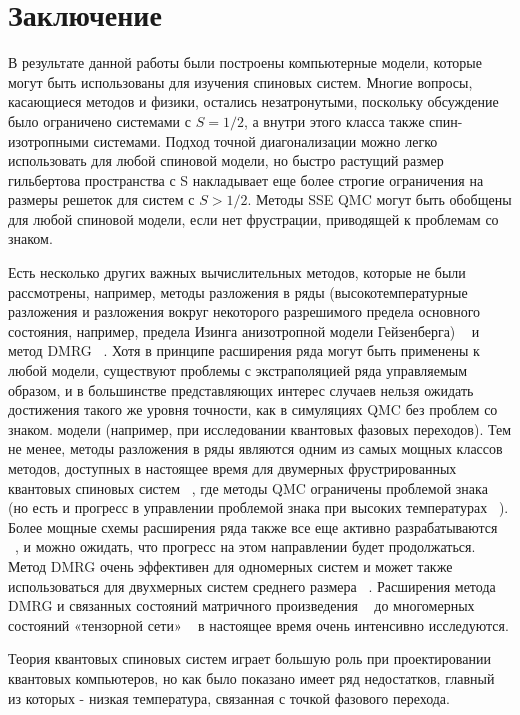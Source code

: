 \documentclass[11pt]{article}
\begin{document}
\section{Заключение}
В результате данной работы были построены компьютерные модели, которые могут быть использованы для изучения спиновых систем.
Многие вопросы, касающиеся методов и физики, остались незатронутыми, поскольку обсуждение было ограничено системами с $S = 1/2$, а внутри этого класса также спин-изотропными системами. Подход точной диагонализации можно легко использовать для любой спиновой модели, но быстро растущий размер гильбертова пространства с S накладывает еще более строгие ограничения на размеры решеток для систем с $S> 1/2$. Методы SSE QMC могут быть обобщены для любой спиновой модели, если нет фрустрации, приводящей к проблемам со знаком. 

Есть несколько других важных вычислительных методов, которые не были рассмотрены, например, методы разложения в ряды (высокотемпературные разложения и разложения вокруг некоторого разрешимого предела основного состояния, например, предела Изинга анизотропной модели Гейзенберга) ~\cite{phys_339, Domb} и метод DMRG ~\cite{prl_69_2863, rmp_77_259}. Хотя в принципе расширения ряда могут быть применены к любой модели, существуют проблемы с экстраполяцией ряда управляемым образом, и в большинстве представляющих интерес случаев нельзя ожидать достижения такого же уровня точности, как в симуляциях QMC без проблем со знаком. модели (например, при исследовании квантовых фазовых переходов). Тем не менее, методы разложения в ряды являются одним из самых мощных классов методов, доступных в настоящее время для двумерных фрустрированных квантовых спиновых систем ~\cite{prb_60_7278}, где методы QMC ограничены проблемой знака (но есть и прогресс в управлении проблемой знака при высоких температурах ~\cite{rmp_67_279}). Более мощные схемы расширения ряда также все еще активно разрабатываются ~\cite{Oitmaa}, и можно ожидать, что прогресс на этом направлении будет продолжаться. Метод DMRG очень эффективен для одномерных систем и может также использоваться для двухмерных систем среднего размера ~\cite{prl_99_127004}. Расширения метода DMRG и связанных состояний матричного произведения ~\cite{Giancoli, cmp_115_477,pre_75_061118} до многомерных состояний «тензорной сети» ~\cite{Giancoli, prb_79_195119, prl_75_3537} в настоящее время очень интенсивно исследуются. 

Теория квантовых спиновых систем играет большую роль при проектировании квантовых компьютеров, но как было показано имеет ряд недостатков, главный из которых - низкая температура, связанная с точкой фазового перехода.
\end{document}
